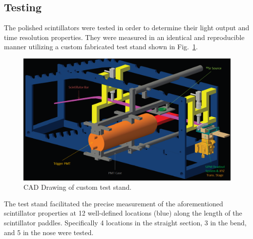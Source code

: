 
\subsection{Testing} \label{sec:fab_test}

The polished scintillators were tested in order to determine their light output and time resolution properties.  They were measured in an identical and reproducible manner utilizing a custom fabricated test stand shown in Fig.~\ref{fig:test_stand_model}. 
	\begin{figure}[!htb]
		\centering
		\includegraphics[width=1.0\columnwidth]{fabrication/figs/test_stand_model}
		\caption{CAD Drawing of custom test stand.}
		\label{fig:test_stand_model}
	\end{figure}
The test stand facilitated the precise measurement of the aforementioned scintillator properties at 12 well-defined locations (blue) along the length of the scintillator paddles.  Specifically 4 locations in the straight section, 3 in the bend, and 5 in the nose were tested.  

